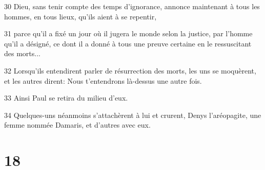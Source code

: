 \par 30 Dieu, sans tenir compte des temps d'ignorance, annonce maintenant à tous les hommes, en tous lieux, qu'ils aient à se repentir,
\par 31 parce qu'il a fixé un jour où il jugera le monde selon la justice, par l'homme qu'il a désigné, ce dont il a donné à tous une preuve certaine en le ressuscitant des morts...
\par 32 Lorsqu'ils entendirent parler de résurrection des morts, les uns se moquèrent, et les autres dirent: Nous t'entendrons là-dessus une autre fois.
\par 33 Ainsi Paul se retira du milieu d'eux.
\par 34 Quelques-uns néanmoins s'attachèrent à lui et crurent, Denys l'aréopagite, une femme nommée Damaris, et d'autres avec eux.

\chapter{18}

